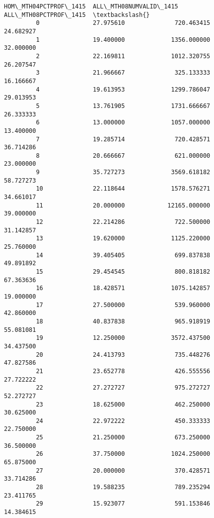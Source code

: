 \documentclass[11pt]{article}
\begin{document}
\begin{Verbatim}[commandchars=\\\{\}]
             HOM\_MTH04PCTPROF\_1415  ALL\_MTH08NUMVALID\_1415  ALL\_MTH08PCTPROF\_1415  \textbackslash{}
         0               27.975610              720.463415              24.682927   
         1               19.400000             1356.000000              32.000000   
         2               22.169811             1012.320755              26.207547   
         3               21.966667              325.133333              16.166667   
         4               19.613953             1299.786047              29.013953   
         5               13.761905             1731.666667              26.333333   
         6               13.000000             1057.000000              13.400000   
         7               19.285714              720.428571              36.714286   
         8               20.666667              621.000000              23.000000   
         9               35.727273             3569.618182              58.727273   
         10              22.118644             1578.576271              34.661017   
         11              20.000000            12165.000000              39.000000   
         12              22.214286              722.500000              31.142857   
         13              19.620000             1125.220000              25.760000   
         14              39.405405              699.837838              49.891892   
         15              29.454545              800.818182              67.363636   
         16              18.428571             1075.142857              19.000000   
         17              27.500000              539.960000              42.860000   
         18              40.837838              965.918919              55.081081   
         19              12.250000             3572.437500              34.437500   
         20              24.413793              735.448276              47.827586   
         21              23.652778              426.555556              27.722222   
         22              27.272727              975.272727              52.272727   
         23              18.625000              462.250000              30.625000   
         24              22.972222              450.333333              22.750000   
         25              21.250000              673.250000              36.500000   
         26              37.750000             1024.250000              65.875000   
         27              20.000000              370.428571              33.714286   
         28              19.588235              789.235294              23.411765   
         29              15.923077              591.153846              14.384615   

\end{Verbatim}
\end{document}
